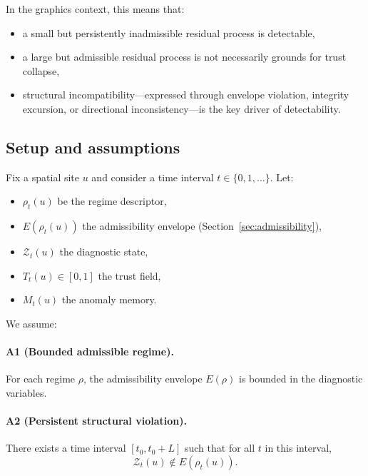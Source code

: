 \documentclass[11pt,letterpaper]{article}
\theoremstyle{gcresult}
\theoremstyle{definition}
\begin{document}
In the graphics context, this means that:
\begin{itemize}[leftmargin=1.5em]
    \item a small but persistently inadmissible residual process is detectable,
    \item a large but admissible residual process is not necessarily grounds for trust collapse,
    \item structural incompatibility—expressed through envelope violation, integrity excursion, or directional inconsistency—is the key driver of detectability.
\end{itemize}


\subsection{Setup and assumptions}

Fix a spatial site $u$ and consider a time interval $t\in\{0,1,\dots\}$. Let:
\begin{itemize}[leftmargin=1.5em]
    \item $\rho_t(u)$ be the regime descriptor,
    \item $E(\rho_t(u))$ the admissibility envelope (Section~\ref{sec:admissibility}),
    \item $\mathcal{Z}_t(u)$ the diagnostic state,
    \item $T_t(u)\in[0,1]$ the trust field,
    \item $M_t(u)$ the anomaly memory.
\end{itemize}

We assume:

\paragraph{A1 (Bounded admissible regime).}
For each regime $\rho$, the admissibility envelope $E(\rho)$ is bounded in the diagnostic variables.

\paragraph{A2 (Persistent structural violation).}
There exists a time interval $[t_0,t_0+L]$ such that for all $t$ in this interval,
\begin{equation}
\mathcal{Z}_t(u)\notin E(\rho_t(u)).
\end{equation}
\end{document}

